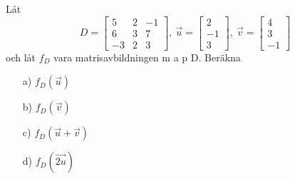 Låt 
\[
	D = 
    \begin{bmatrix}
    5	&	2	&	-1	\\
    6	&	3	&	7	\\
    -3	&	2	&	3
    \end{bmatrix}  
    ,\>
    \vec{u} =
    \begin{bmatrix}
    2   	\\
   	-1 		\\
   	3		
   	\end{bmatrix}
   	,\>
    \vec{v} =
    \begin{bmatrix}
    4   	\\
   	3 		\\
   	-1		
   	\end{bmatrix}
\]
och låt $f_D$ vara matrisavbildningen m a p D. Beräkna
\begin{itemize}
	\item[a) ]	$f_{D}(\vec{u})$
	\item[b) ]	$f_{D}(\vec{v})$
	\item[c) ]	$f_{D}(\vec{u} + \vec{v})$
	\item[d) ]	$f_{D}(\vec{2u})$
\end{itemize}
